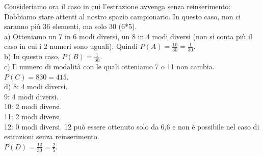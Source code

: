 \documentclass{article}
\begin{document}
\begin{enumerate}
{Consideriamo ora il caso in cui l'estrazione avvenga senza reinserimento:\\
Dobbiamo stare attenti al nostro spazio campionario. In questo caso, non ci saranno più 36 elementi, ma solo 30 (6*5).\\
a) Otteniamo un 7 in 6 modi diversi, un 8 in 4 modi diversi (non si conta più il caso in cui i 2 numeri sono uguali). Quindi $P(A) = \frac{10}{30} = \frac{1}{30}$.\\
b) In questo caso, $P(B)=\frac{1}{30}$.\\
c) Il numero di modalità con le quali otteniamo 7 o 11 non cambia. $P(C)={8}{30}={4}{15}$.\\
d) 8: 4 modi diversi.\\
9: 4 modi diversi.\\
10: 2 modi diversi.\\
11: 2 modi diversi.\\
12: 0 modi diversi. 12 può essere ottenuto solo da 6,6 e non è possibile nel caso di estrazioni senza reinserimento.\\
$P(D)=\frac{12}{30}=\frac{2}{5}$.
}
\end{enumerate}
\end{document}
